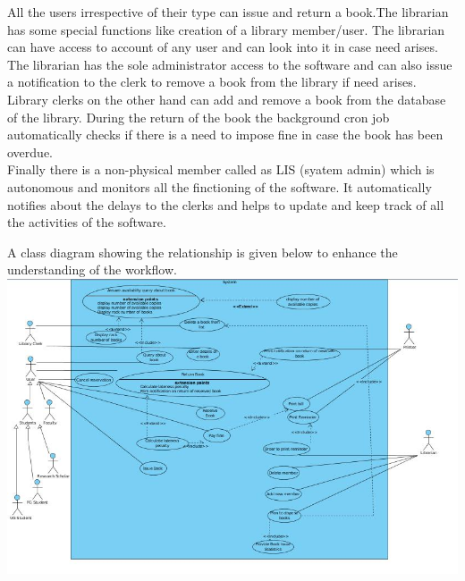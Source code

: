 \documentclass{article}
\begin{document}
All the users irrespective of their type can issue and return a book.The librarian has some special functions like creation of a library member/user. The librarian can have access to account of any user and can look into it in case need arises.\\
The librarian has the sole administrator access to the software and can also issue a notification to the clerk to remove a book from the library if need arises.\\
Library clerks on the other hand can add and remove a book from the database of the library. During the return of the book the background cron job automatically checks if there is a need to impose fine in case the book has been overdue.\\

Finally there is a non-physical member called as LIS (syatem admin) which is autonomous and monitors all the finctioning of the software. It automatically notifies about the delays to the clerks and helps to update and keep track of all the activities of the software.

A class diagram showing the relationship is given below to enhance the understanding of the workflow.\\

\includegraphics[scale=0.60]{images/useCaseDiag.jpg}
\end{document}
